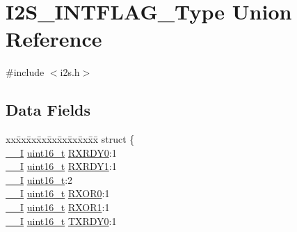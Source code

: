 \hypertarget{union_i2_s___i_n_t_f_l_a_g___type}{}\section{I2\+S\+\_\+\+I\+N\+T\+F\+L\+A\+G\+\_\+\+Type Union Reference}
\label{union_i2_s___i_n_t_f_l_a_g___type}


{\ttfamily \#include $<$i2s.\+h$>$}

\subsection*{Data Fields}
\begin{DoxyCompactItemize}
\item 
\begin{tabbing}
xx\=xx\=xx\=xx\=xx\=xx\=xx\=xx\=xx\=\kill
struct \{\\
\>\mbox{\hyperlink{core__cm0plus_8h_af63697ed9952cc71e1225efe205f6cd3}{\_\_I}} \mbox{\hyperlink{union_i2_s___i_n_t_f_l_a_g___type_a25e8fd3335b0c4872c6e2910bd01f0f6}{uint16\_t}} \mbox{\hyperlink{union_i2_s___i_n_t_f_l_a_g___type_ac78a93587e38ac49a32e6111fc8c583d}{RXRDY0}}:1\\
\>\mbox{\hyperlink{core__cm0plus_8h_af63697ed9952cc71e1225efe205f6cd3}{\_\_I}} \mbox{\hyperlink{union_i2_s___i_n_t_f_l_a_g___type_a25e8fd3335b0c4872c6e2910bd01f0f6}{uint16\_t}} \mbox{\hyperlink{union_i2_s___i_n_t_f_l_a_g___type_ad4ff4e0727b9825f042f7c825ba3d169}{RXRDY1}}:1\\
\>\mbox{\hyperlink{core__cm0plus_8h_af63697ed9952cc71e1225efe205f6cd3}{\_\_I}} \mbox{\hyperlink{union_i2_s___i_n_t_f_l_a_g___type_a25e8fd3335b0c4872c6e2910bd01f0f6}{uint16\_t}}:2\\
\>\mbox{\hyperlink{core__cm0plus_8h_af63697ed9952cc71e1225efe205f6cd3}{\_\_I}} \mbox{\hyperlink{union_i2_s___i_n_t_f_l_a_g___type_a25e8fd3335b0c4872c6e2910bd01f0f6}{uint16\_t}} \mbox{\hyperlink{union_i2_s___i_n_t_f_l_a_g___type_a8bfa1bda4e3192da19952fe3a9fa25d9}{RXOR0}}:1\\
\>\mbox{\hyperlink{core__cm0plus_8h_af63697ed9952cc71e1225efe205f6cd3}{\_\_I}} \mbox{\hyperlink{union_i2_s___i_n_t_f_l_a_g___type_a25e8fd3335b0c4872c6e2910bd01f0f6}{uint16\_t}} \mbox{\hyperlink{union_i2_s___i_n_t_f_l_a_g___type_a7d02d9788465812e76bc5e4246f971c3}{RXOR1}}:1\\
\>\mbox{\hyperlink{core__cm0plus_8h_af63697ed9952cc71e1225efe205f6cd3}{\_\_I}} \mbox{\hyperlink{union_i2_s___i_n_t_f_l_a_g___type_a25e8fd3335b0c4872c6e2910bd01f0f6}{uint16\_t}} \mbox{\hyperlink{union_i2_s___i_n_t_f_l_a_g___type_a81949ebae50dc5b3de9c8cf5726e25b6}{TXRDY0}}:1\\

\end{tabbing}
\end{DoxyCompactItemize}
